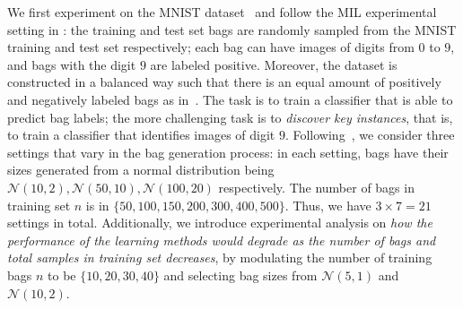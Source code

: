 \documentclass{article}
\begin{document}
We first experiment on the MNIST dataset~\citep{lecun1998mnist}
and follow the MIL experimental setting in \citet{ilse2018attention}:
the training and test set bags are randomly sampled from the MNIST training and test set respectively; 
each bag can have
images of digits from $0$ to $9$,
and bags with the digit $9$ are labeled positive.
Moreover, the dataset is constructed in a balanced way such that there is
an equal amount of positively and negatively labeled bags as in~\citet{ilse2018attention}.
The task is to train a classifier that is able to predict bag labels; the more challenging task is to \emph{discover key instances}, that is, to train a classifier that identifies images of digit $9$. Following~\citet{ilse2018attention},
we consider three settings that vary in the bag generation process:
in each setting, bags have their sizes generated from a normal distribution being $\mathcal{N}(10, 2), \mathcal{N}(50, 10), \mathcal{N}(100, 20)$ respectively.
The number of bags in training set $n$ is in $\{50, 100, 150, 200, 300, 400, 500\}$. Thus, we have $3 \times 7 = 21$ settings in total.
Additionally,
we introduce experimental analysis on \emph{how the performance of the learning methods would degrade as the number of bags and total samples in training set decreases},
by modulating the number of training bags $n$ to be $\{10, 20, 30, 40\}$ and selecting bag sizes from $\mathcal{N}(5, 1)$ and $\mathcal{N}(10, 2)$.
\end{document}
